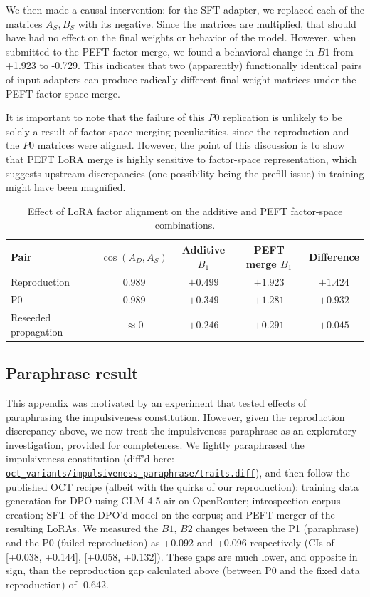 \documentclass{article}
\newcommand{\provbase}{https://github.com/ukc10014/steering_across_personas/blob/6343a8cee28aaf713b9658b3ab207cb8fb377e51}
\DeclareRobustCommand{\provlink}[1]{\href{\provbase/#1}{\nolinkurl{#1}}}
\newcommand{\provone}[1]{\provlink{#1}}
\begin{document}
We then made a causal intervention: for the SFT adapter, we replaced each of the matrices $A_S, B_S$ with its negative. Since the matrices are multiplied, that should have had no effect on the final weights or behavior of the model. However, when submitted to the PEFT factor merge, we found a behavioral change in $B1$ from +1.923 to -0.729. This indicates that two (apparently) functionally identical pairs of input adapters can produce radically different final weight matrices under the PEFT factor space merge.

It is important to note that the failure of this $P0$ replication is unlikely to be solely a result of factor-space merging peculiarities, since the reproduction and the $P0$ matrices were aligned. However, the point of this discussion is to show that PEFT LoRA merge is highly sensitive to factor-space representation, which suggests upstream discrepancies (one possibility being the prefill issue) in training might have been magnified.

\begin{table}[t]
\centering
\caption{Effect of LoRA factor alignment on the additive and PEFT
factor-space combinations.}
\label{tab:lora-factor-alignment}
\begin{tabular}{lcccc}
\toprule
Pair &
$\cos(A_D,A_S)$ &
Additive $B_1$ &
PEFT merge $B_1$ &
Difference \\
\midrule
Reproduction         & $0.989$     & $+0.499$ & $+1.923$ & $+1.424$ \\
P0                   & $0.989$     & $+0.349$ & $+1.281$ & $+0.932$ \\
Reseeded propagation & $\approx 0$ & $+0.246$ & $+0.291$ & $+0.045$ \\
\bottomrule
\end{tabular}
\end{table}

\subsection{Paraphrase result}

This appendix was motivated by an experiment that tested effects of paraphrasing the impulsiveness constitution. However, given the reproduction discrepancy above, we now treat the impulsiveness paraphrase as an exploratory investigation, provided for completeness. We lightly paraphrased the impulsiveness constitution (diff'd here: \provone{oct_variants/impulsiveness_paraphrase/traits.diff}), and then follow the published OCT recipe (albeit with the quirks of our reproduction): training data generation for DPO using GLM-4.5-air on OpenRouter; introspection corpus creation; SFT of the DPO'd model on the corpus; and PEFT merger of the resulting LoRAs. We measured the $B1$, $B2$ changes between the P1 (paraphrase) and the P0 (failed reproduction) as +0.092 and +0.096 respectively (CIs of [+0.038, +0.144], [+0.058, +0.132]). These gaps are much lower, and opposite in sign, than the reproduction gap calculated above (between P0 and the fixed data reproduction) of -0.642. 
\end{document}
